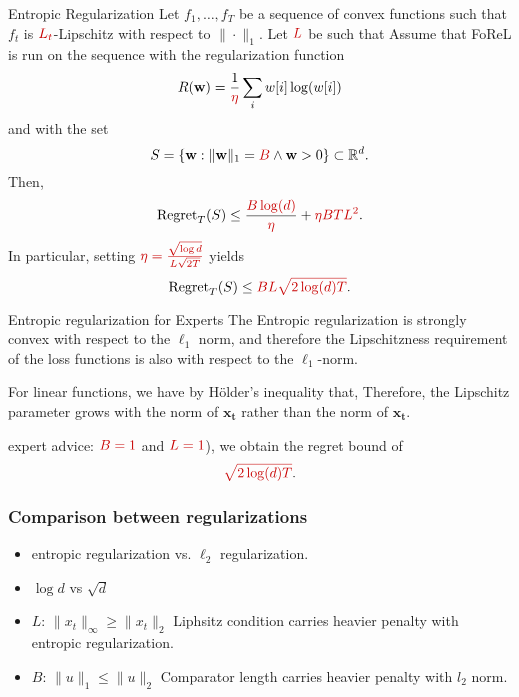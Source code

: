 \documentclass[handout]{beamer}
\newcommand{\redmath}[1]{\textcolor{mathred}{#1}}
\begin{document}
\begin{small}
\begin{frame}{Entropic Regularization}
    Let \( f_1, \dots, f_T \) be a sequence of convex functions such that 
    \( f_t \) is \( \redmath{L_t} \)-Lipschitz with respect to \( \|\cdot\|_1 \). 
    Let \( \redmath{L} \) be such that 
    \R{$
    \frac{1}{T} \sum_{t=1}^{T} \redmath{L_t^2} \leq \redmath{L^2}.
    $}
    Assume that FoReL is run on the sequence with the regularization function 
    \[
    R(\mathbf{w}) = \frac{1}{\redmath{\eta}} \sum_{i} w[i] \log(w[i])
    \]
    and with the set 
    \[
    S = \{\mathbf{w} : \|\mathbf{w}\|_1 = \redmath{B} \wedge \mathbf{w} > 0 \} \subset \mathbb{R}^d.
    \]
    Then, 
    \[
    \text{Regret}_T(S) \leq \frac{\redmath{B \log(d)}}{\redmath{\eta}} + \redmath{\eta BTL^2}.
    \]
    In particular, setting \( \redmath{\eta = \frac{\sqrt{\log d}}{L\sqrt{2T}}} \) yields
    \[
    \text{Regret}_T(S) \leq \redmath{BL\sqrt{2\log(d)T}}.
    \]
  \end{frame}


\begin{frame}{Entropic regularization for Experts}
    The Entropic regularization is strongly convex with respect to the \( \ell_1 \) norm, and therefore the Lipschitzness requirement of the loss functions is also with respect to the \( \ell_1 \)-norm. 
    
    For linear functions, 
    \R{\[
    f_t(\mathbf{w}) = \langle \mathbf{w}, \mathbf{x_t} \rangle,
    \]}
    we have by Hölder’s inequality that,
    \R{\[
    | f_t(\mathbf{w}) - f_t(\mathbf{u}) | = | \langle \mathbf{w} - \mathbf{u}, \mathbf{x_t} \rangle | 
    \leq \| \mathbf{w} - \mathbf{u} \|_1 \|\mathbf{x_t} \|_\infty.
    \]}
    Therefore, the Lipschitz parameter grows with the \R{\( \ell_\infty \)} norm of \( \mathbf{x_t} \) rather than the  norm of \( \mathbf{x_t} \). 
    
    expert advice: \( \redmath{B = 1} \) and \( \redmath{L = 1} \)), we obtain the regret bound of 
    \[
    \redmath{\sqrt{2\log(d)T}}.
    \]
\end{frame}

\begin{frame}
  \frametitle{Comparison between regularizations}
  \begin{itemize}
  \item entropic regularization vs. $\ell_2$ regularization.
  \item $\log {d}$ vs $\sqrt{d}$
  \item $L$: $\|x_t\|_{\infty} \geq \|x_t\|_{2}$ Liphsitz condition carries heavier penalty with entropic regularization.
  \item $B$: $\|u\|_1 \leq \|u\|_{2}$ Comparator length carries heavier penalty with $l_2$ norm.
  \end{itemize}
\end{frame}

\end{small}
\end{document}
